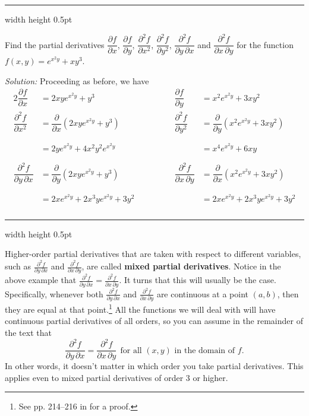 \vspace{3mm}
\hrule width \textwidth height 0.5pt
\begin{exmp}
 Find the partial derivatives $\dfrac{\partial f}{\partial x}$, $\dfrac{\partial f}{\partial y}$,
 $\dfrac{\partial^2 f}{\partial x^2}$,
 $\dfrac{\partial^2 f}{\partial y^2}$, $\dfrac{\partial^2 f}{\partial y \, \partial x}$ and
 $\dfrac{\partial^2 f}{\partial x \, \partial y}$ for the function
 $f(x,y) = e^{x^2 y} + xy^3$.\vspace{1mm}
 \par\noindent\emph{Solution:} Proceeding as before, we have
 \begin{alignat*}{2}
  \dfrac{\partial f}{\partial x} &= 2xy e^{x^2 y} + y^3\qquad\qquad
  & \dfrac{\partial f}{\partial y} &= x^2 e^{x^2 y} + 3xy^2\\
  \dfrac{\partial^2 f}{\partial x^2} &= \dfrac{\partial}{\partial x} (2xy e^{x^2 y} + y^3)\qquad\qquad
  & \dfrac{\partial^2 f}{\partial y^2} &= \dfrac{\partial}{\partial y} (x^2 e^{x^2 y} + 3xy^2)\\
  \phantom{\dfrac{\partial^2 f}{\partial x^2}} &= 2y e^{x^2 y} + 4x^2 y^2 e^{x^2 y}\qquad\qquad
   & \phantom{\dfrac{\partial^2 f}{\partial y^2}} &= x^4 e^{x^2 y} + 6xy\\
  \dfrac{\partial^2 f}{\partial y \, \partial x} &= \dfrac{\partial}{\partial y} (2xy e^{x^2 y} + y^3)\qquad\qquad
  & \dfrac{\partial^2 f}{\partial x \, \partial y} &= \dfrac{\partial}{\partial x} (x^2 e^{x^2 y} + 3xy^2)\\
  \phantom{\dfrac{\partial^2 f}{\partial y \, \partial x}} &= 2x e^{x^2 y} + 2x^3 y e^{x^2 y} + 3y^2\qquad\qquad
   & \phantom{\dfrac{\partial^2 f}{\partial x \, \partial y}} &= 2x e^{x^2 y} + 2x^3 y e^{x^2 y} + 3y^2
 \end{alignat*}
\end{exmp}
\hrule width \textwidth height 0.5pt
\vspace{3mm}

Higher-order partial derivatives that are taken with respect to different variables, such as
$\frac{\partial^2 f}{\partial y \, \partial x}$ and $\frac{\partial^2 f}{\partial x \, \partial y}$, are called
\textbf{mixed partial derivatives}.
Notice in the above example that $\frac{\partial^2 f}{\partial y \, \partial x} =
\frac{\partial^2 f}{\partial x \, \partial y}$. It turns that this will usually be the case. Specifically,
whenever both $\frac{\partial^2 f}{\partial y \, \partial x}$ and $\frac{\partial^2 f}{\partial x \, \partial y}$ are
continuous at a point $(a,b)$, then they are equal at that point.\footnote{See pp. 214--216
in \cite{tm} for a proof.} All the functions we will deal with will have continuous partial derivatives of all
orders, so you can assume in the remainder of the text that
\begin{displaymath}
 \frac{\partial^2 f}{\partial y \, \partial x} = \frac{\partial^2 f}{\partial x \, \partial y} ~~
 \text{for all $(x,y)$ in the domain of $f$.}
\end{displaymath}
In other words, it doesn't matter
in which order you take partial derivatives. This applies even to mixed partial derivatives of order $3$ or higher.

